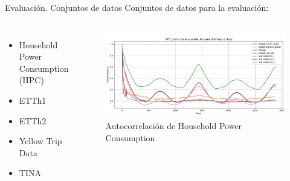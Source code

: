 \documentclass[compress]{beamer}
\begin{document}
	\begin{frame}{Evaluación. Conjuntos de datos}
		Conjuntos de datos para la evaluación:
		
		\begin{columns}
			
			\begin{itemize}
				\item Household Power Consumption (HPC)
				\item ETTh1
				\item ETTh2
				\item Yellow Trip Data
				\item TINA
			\end{itemize}
		
			\centering
			\begin{figure}
				\includegraphics[width=\linewidth]{pic/auto.png}
				\caption{Autocorrelación de Household Power Consumption}
			\end{figure}
		
		\end{columns} 
				
	\end{frame}
	
\end{document}
